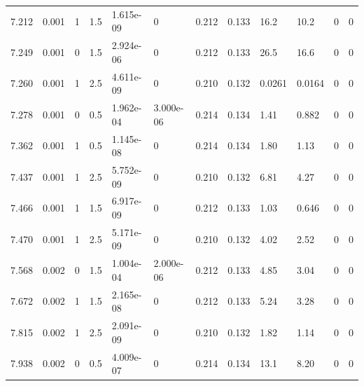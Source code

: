\documentclass[preview]{standalone}
\begin{document}
{{{\begin{tabular}{L{1.2cm}C{1.2cm} C{0.3cm}C{0.5cm} C{1.4cm}C{1.4cm} C{1.4cm}C{1.4cm} C{1.6cm}C{1.6cm} C{1.6cm}C{1.6cm}}
  7.212  &  0.001  & 1     & 1.5 &  1.615e-09  & 0  &  0.212&   0.133& 16.2 & 10.2   &  0 & 0  \\ 
  7.249  &  0.001  & 0     & 1.5 &  2.924e-06  & 0  &  0.212&   0.133& 26.5 & 16.6   &  0 & 0  \\ 
  7.260  &  0.001  & 1     & 2.5 &  4.611e-09  & 0  &  0.210&   0.132& 0.0261 & 0.0164   &  0 & 0  \\ 
  7.278  &  0.001  & 0     & 0.5 &  1.962e-04  & 3.000e-06  &  0.214&   0.134& 1.41 & 0.882   &  0 & 0  \\ 
  7.362  &  0.001  & 1     & 0.5 &  1.145e-08  & 0  &  0.214&   0.134& 1.80 & 1.13   &  0 & 0  \\ 
  7.437  &  0.001  & 1     & 2.5 &  5.752e-09  & 0  &  0.210&   0.132& 6.81 & 4.27   &  0 & 0  \\ 
  7.466  &  0.001  & 1     & 1.5 &  6.917e-09  & 0  &  0.212&   0.133& 1.03 & 0.646   &  0 & 0  \\ 
  7.470  &  0.001  & 1     & 2.5 &  5.171e-09  & 0  &  0.210&   0.132& 4.02 & 2.52   &  0 & 0  \\ 
  7.568  &  0.002  & 0     & 1.5 &  1.004e-04  & 2.000e-06  &  0.212&   0.133& 4.85 & 3.04   &  0 & 0  \\ 
  7.672  &  0.002  & 1     & 1.5 &  2.165e-08  & 0  &  0.212&   0.133& 5.24 & 3.28   &  0 & 0  \\ 
  7.815  &  0.002  & 1     & 2.5 &  2.091e-09  & 0  &  0.210&   0.132& 1.82 & 1.14   &  0 & 0  \\ 
  7.938  &  0.002  & 0     & 0.5 &  4.009e-07  & 0  &  0.214&   0.134& 13.1 & 8.20   &  0 & 0  \\ 
\hline 
\end{tabular} 

}}}
\end{document}

